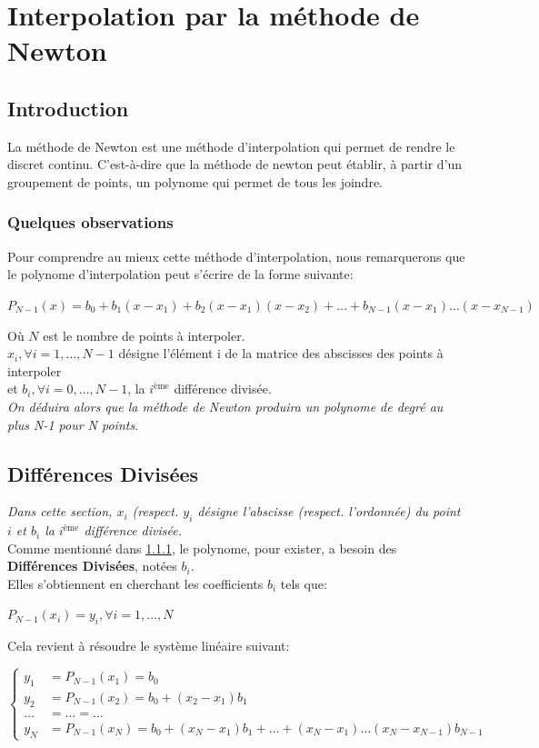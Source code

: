 \section{Interpolation par la méthode de Newton}
\subsection{Introduction}
La méthode de Newton est une méthode d'interpolation qui permet de rendre le discret continu. C'est-à-dire que la méthode de newton peut établir, à partir d'un groupement de points, un polynome qui permet de tous les joindre. \\
\subsubsection{Quelques observations} \label{obs}
Pour comprendre au mieux cette méthode d'interpolation, nous remarquerons que le polynome d'interpolation peut s'écrire de la forme suivante:\\
\begin{center}
$P_{N-1}(x) = b_0 + b_1 (x-x_1) + b_2(x-x_1)(x-x_2)+ \ldots+b_{N-1}(x-x_1)\ldots(x-x_{N-1})$
\end{center}
Où $N$ est le nombre de points à interpoler. \\
$x_i, \forall i = 1,\ldots,N-1$ désigne l'élément i de la matrice des abscisses des points à interpoler  \\
et $b_i, \forall i=0,\ldots, N-1$, la $i^{\text{ème}}$ différence divisée. \\
\textit{On déduira alors que la méthode de Newton produira un polynome de degré au plus N-1 pour N points}.\\


\subsection{Différences Divisées}
\textit{Dans cette section, $x_i$ (respect. $y_i$ désigne l'abscisse (respect. l'ordonnée) du point $i$ et $b_i$ la $i^{\text{ème}}$ différence divisée.}\\
Comme mentionné dans \ref{obs}, le polynome, pour exister, a besoin des \textbf{Différences Divisées}, notées \textit{$b_i$}.\\
Elles s'obtiennent en cherchant les coefficients $b_i$ tels que:
\begin{center}
$P_{N-1}(x_i) = y_i, \forall i=1,\ldots,N$
\end{center}
Cela revient à résoudre le système linéaire suivant:
\begin{center}
$
\begin{cases}
y_1 & = P_{N-1}(x_1) = b_0 \\
y_2 & = P_{N-1}(x_2) = b_0 + (x_2 - x_1) b_1 \\
\ldots&= \ldots  = \ldots \\
y_N &= P_{N-1}(x_N)= b_0 + (x_N - x_1)b_1+\ldots+(x_N-x_1)\ldots(x_N-x_{N-1})b_{N-1}
\end{cases}
$
\end{center}
